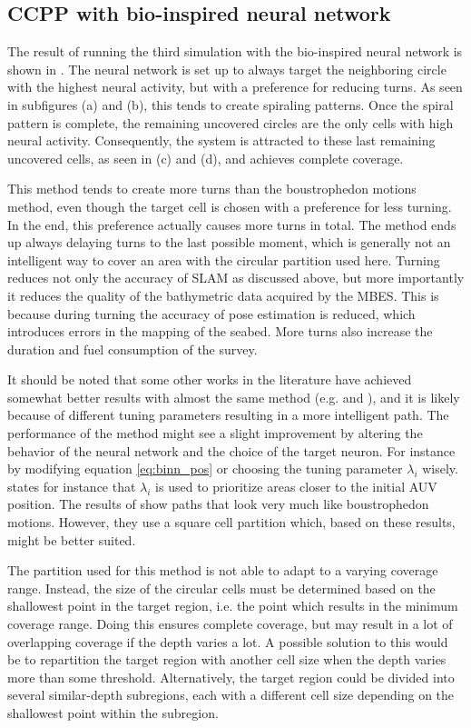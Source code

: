 \subsection{CCPP with bio-inspired neural network}

The result of running the third simulation with the bio-inspired neural network is shown in . The neural network is set up to always target the neighboring circle with the highest neural activity, but with a preference for reducing turns. As seen in subfigures (a) and (b), this tends to create spiraling patterns. Once the spiral pattern is complete, the remaining uncovered circles are the only cells with high neural activity. Consequently, the system is attracted to these last remaining uncovered cells, as seen in (c) and (d), and achieves complete coverage.

This method tends to create more turns than the boustrophedon motions method, even though the target cell is chosen with a preference for less turning. In the end, this preference actually causes more turns in total. The method ends up always delaying turns to the last possible moment, which is generally not an intelligent way to cover an area with the circular partition used here. Turning reduces not only the accuracy of SLAM as discussed above, but more importantly it reduces the quality of the bathymetric data acquired by the MBES. This is because during turning the accuracy of pose estimation is reduced, which introduces errors in the mapping of the seabed. More turns also increase the duration and fuel consumption of the survey. 

It should be noted that some other works in the literature have achieved somewhat better results with almost the same method (e.g. \citet{Scibilia2012} and \citet{luo2008bioinspired}), and it is likely because of different tuning parameters resulting in a more intelligent path. The performance of the method might see a slight improvement by altering the behavior of the neural network and the choice of the target neuron. For instance by modifying equation \eqref{eq:binn_pos} or choosing the tuning parameter $\lambda_i$ wisely. \citet{Scibilia2012} states for instance that $\lambda_i$ is used to prioritize areas closer to the initial AUV position. The results of \citet{luo2008bioinspired} show paths that look very much like boustrophedon motions. However, they use a square cell partition which, based on these results, might be better suited.

The partition used for this method is not able to adapt to a varying coverage range. Instead, the size of the circular cells must be determined based on the shallowest point in the target region, i.e. the point which results in the minimum coverage range. Doing this ensures complete coverage, but may result in a lot of overlapping coverage if the depth varies a lot. A possible solution to this would be to repartition the target region with another cell size when the depth varies more than some threshold. Alternatively, the target region could be divided into several similar-depth subregions, each with a different cell size depending on the shallowest point within the subregion.

